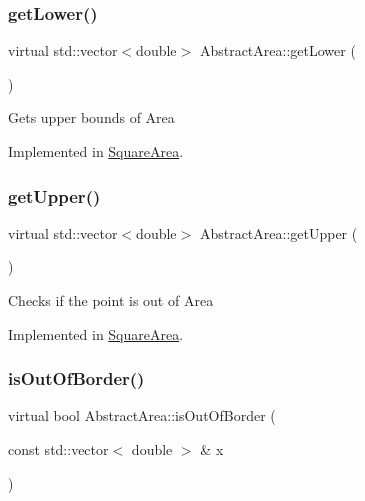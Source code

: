 \mbox{\label{class_abstract_area_a6f5b9321813c982b37810b97c2a90257}} 
\subsubsection{\texorpdfstring{get\+Lower()}{getLower()}}
{\footnotesize\ttfamily virtual std\+::vector$<$double$>$ Abstract\+Area\+::get\+Lower (\begin{DoxyParamCaption}{ }\end{DoxyParamCaption})\hspace{0.3cm}{\ttfamily [pure virtual]}}

Gets upper bounds of Area 

Implemented in \hyperlink{class_square_area_a251a1ca1fc74129265c9d53ed508bf22}{Square\+Area}.

\mbox{\label{class_abstract_area_ab54f9d3063d994f780f2b5b67d8751d9}} 
\subsubsection{\texorpdfstring{get\+Upper()}{getUpper()}}
{\footnotesize\ttfamily virtual std\+::vector$<$double$>$ Abstract\+Area\+::get\+Upper (\begin{DoxyParamCaption}{ }\end{DoxyParamCaption})\hspace{0.3cm}{\ttfamily [pure virtual]}}

Checks if the point is out of Area 

Implemented in \hyperlink{class_square_area_ae9e9fa4d73c245d00c9bce0786fdce5c}{Square\+Area}.

\mbox{\label{class_abstract_area_a16c1ac9b2ece460e5e465cda862ce278}} 
\subsubsection{\texorpdfstring{is\+Out\+Of\+Border()}{isOutOfBorder()}}
{\footnotesize\ttfamily virtual bool Abstract\+Area\+::is\+Out\+Of\+Border (\begin{DoxyParamCaption}\item[{const std\+::vector$<$ double $>$ \&}]{x }\end{DoxyParamCaption})\hspace{0.3cm}{\ttfamily [pure virtual]}}

